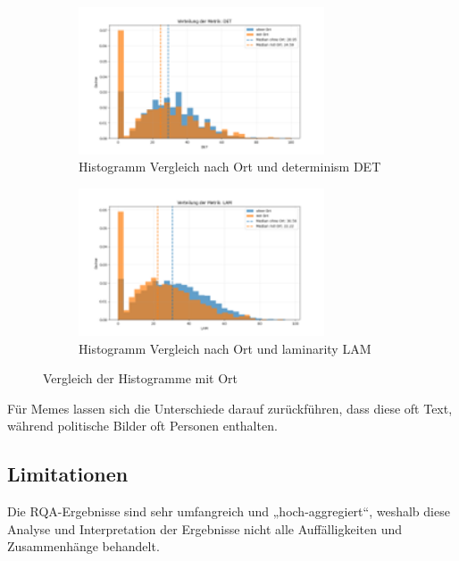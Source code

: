 \documentclass[
    language=german, %
    thesis=seminar, %
    supervisor=postdoc, %
    multiauthor=true, %
    ]{settings/csssa-thesis}
\begin{document}
\begin{figure}[ht]
    \centering
    \begin{subfigure}{0.49\textwidth}
        \centering
        \includegraphics[width=0.8\textwidth]{figures/Bild24.png}
        \caption{Histogramm Vergleich nach Ort und determinism DET }\label{fig:Bild20a}
    \end{subfigure}
    \begin{subfigure}{0.49\textwidth}
        \centering
        \includegraphics[width=0.8\textwidth]{figures/Bild25.png}
        \caption{Histogramm Vergleich nach Ort und laminarity LAM}\label{fig:Bild20b}
    \end{subfigure}\label{fig:Bild20}
    \caption{Vergleich der Histogramme mit Ort}
\end{figure}

Für Memes lassen sich die Unterschiede darauf zurückführen, dass diese oft Text, während politische Bilder oft Personen enthalten.  

\subsection{Limitationen}
Die RQA-Ergebnisse sind sehr umfangreich und „hoch-aggregiert“, weshalb diese Analyse und 
Interpretation der Ergebnisse nicht alle Auffälligkeiten und Zusammenhänge behandelt. 
\end{document}

